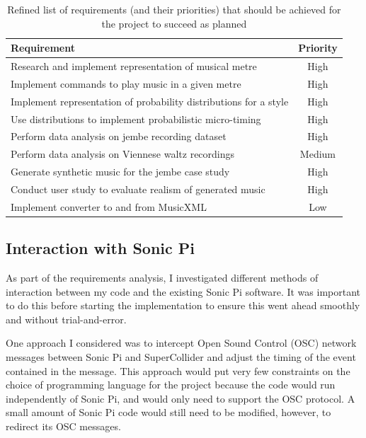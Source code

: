 \documentclass[12pt,twoside,openright]{report}
\begin{document}
\begin{table}[ht]
\centering
\begin{tabularx}{400pt}{Xc}
    \toprule
    \textbf{Requirement}                                      & \textbf{Priority} \\
    \midrule
    Research and implement representation of musical metre              & High \\
    Implement commands to play music in a given metre                   & High \\
    Implement representation of probability distributions for a style   & High \\
    Use distributions to implement probabilistic micro-timing           & High \\
    Perform data analysis on jembe recording dataset                    & High \\
    Perform data analysis on Viennese waltz recordings                  & Medium \\
    Generate synthetic music for the jembe case study                   & High \\
    Conduct user study to evaluate realism of generated music           & High \\
    Implement converter to and from MusicXML                            & Low \\
    \bottomrule
\end{tabularx}
\caption{Refined list of requirements (and their priorities) that should be achieved for the project to succeed as planned}
\label{table:requirements}
\end{table}


\subsection{Interaction with Sonic Pi}

As part of the requirements analysis, I investigated different methods of
interaction between my code and the existing Sonic Pi software. It was important
to do this before starting the implementation to ensure this went ahead smoothly
and without trial-and-error.

One approach I considered was to intercept Open Sound Control (OSC) network
messages between Sonic Pi and SuperCollider and adjust the timing of the event
contained in the message. This approach would put very few constraints on the choice of programming language for the project because the code would run independently of Sonic Pi, and would only need to support the OSC protocol. A small amount of Sonic Pi code would still need to be modified, however, to redirect its OSC messages.
\end{document}
